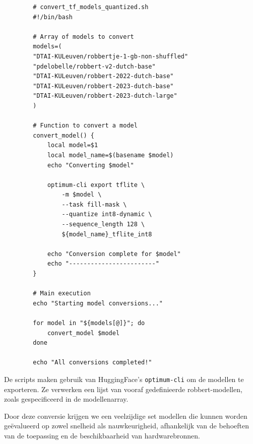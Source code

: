 \begin{listing}
    \begin{verbatim}
        # convert_tf_models_quantized.sh
        #!/bin/bash
        
        # Array of models to convert
        models=(
        "DTAI-KULeuven/robbertje-1-gb-non-shuffled"
        "pdelobelle/robbert-v2-dutch-base"
        "DTAI-KULeuven/robbert-2022-dutch-base"
        "DTAI-KULeuven/robbert-2023-dutch-base"
        "DTAI-KULeuven/robbert-2023-dutch-large"
        )
        
        # Function to convert a model
        convert_model() {
            local model=$1
            local model_name=$(basename $model)
            echo "Converting $model"
            
            optimum-cli export tflite \
                -m $model \
                --task fill-mask \
                --quantize int8-dynamic \
                --sequence_length 128 \
                ${model_name}_tflite_int8
            
            echo "Conversion complete for $model"
            echo "------------------------"
        }
        
        # Main execution
        echo "Starting model conversions..."
        
        for model in "${models[@]}"; do
            convert_model $model
        done
        
        echo "All conversions completed!"
    \end{verbatim}
    \caption[\texttt{convert\_tf\_models\_quantized.sh}]{Het \texttt{convert\_tf\_models\_quantized.sh} script voert de conversie van de \gls{robbert}-modellen uit naar het -formaat met een vaste sequentielengte van 128 tokens alsook int8-dynamische kwantisering. Deze stap vermindert de modelgrootte en kan de inferentiesnelheid verhogen.}
    \label{lst:convert-tf-models-quantized}
\end{listing}

De scripts maken gebruik van HuggingFace's \texttt{optimum-cli} om de modellen te exporteren. Ze verwerken een lijst van vooraf gedefinieerde \gls{robbert}-modellen, zoals gespecificeerd in de modellenarray.

Door deze conversie krijgen we een veelzijdige set modellen die kunnen worden geëvalueerd op zowel snelheid als nauwkeurigheid, afhankelijk van de behoeften van de toepassing en de beschikbaarheid van hardwarebronnen.

